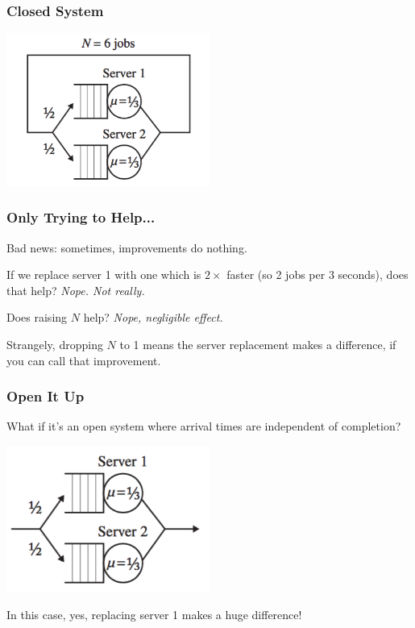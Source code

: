 \begin{frame}
\frametitle{Closed System}

\begin{center}
	\includegraphics[width=0.5\textwidth]{images/qt-example2.png}
\end{center}

\end{frame}



\begin{frame}
\frametitle{Only Trying to Help...}

Bad news: sometimes, improvements do nothing. 

If we replace server 1 with one which is $2\times$ faster (so 2 jobs per 3 seconds), does that help? \emph{Nope. Not really.}

Does raising $N$ help? \emph{Nope, negligible effect.}

Strangely, dropping $N$ to 1 means the server replacement makes a difference, if you can call that improvement.

\end{frame}



\begin{frame}
\frametitle{Open It Up}

What if it's an \alert{open system} where arrival times are independent of completion?

\begin{center}
	\includegraphics[width=0.5\textwidth]{images/qt-example2-2.png}
\end{center}

In this case, yes, replacing server 1 makes a huge difference!

\end{frame}



